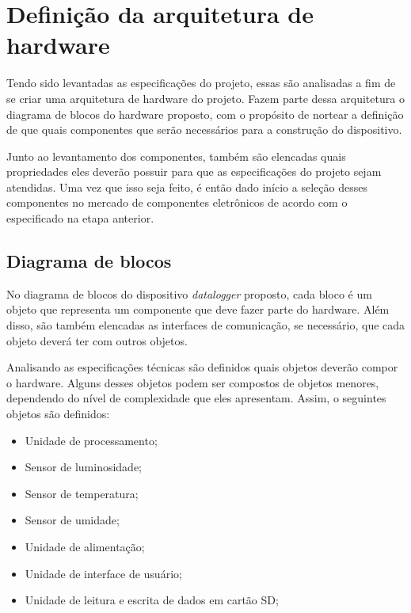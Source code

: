 \section{Definição da arquitetura de hardware}

Tendo sido levantadas as especificações do projeto, essas são analisadas a fim de se criar uma arquitetura de hardware do projeto. Fazem parte dessa arquitetura o diagrama de blocos do hardware proposto, com o propósito de nortear a definição de que quais componentes que serão necessários para a construção do dispositivo. 

Junto ao levantamento dos componentes, também são elencadas quais propriedades eles deverão possuir para que as especificações do projeto sejam atendidas. Uma vez que isso seja feito, é então dado início a seleção desses componentes no mercado de componentes eletrônicos de acordo com o especificado na etapa anterior.

\subsection{Diagrama de blocos}

No diagrama de blocos do dispositivo \textit{datalogger} proposto, cada bloco é um objeto que representa um componente que deve fazer parte do hardware. Além disso, são também elencadas as interfaces de comunicação, se necessário, que cada objeto deverá ter com outros objetos. 

Analisando as especificações técnicas são definidos quais objetos deverão compor  o hardware. Alguns desses objetos podem ser compostos de objetos menores, dependendo do nível de complexidade que eles apresentam. Assim, o seguintes objetos são definidos:

 \begin{itemize}
     \item Unidade de processamento;
     \item Sensor de luminosidade;
     \item Sensor de temperatura; 
     \item Sensor de umidade;
     \item Unidade de alimentação;
     \item Unidade de interface de usuário;
     \item Unidade de leitura e escrita de dados em cartão SD;
 \end{itemize}

